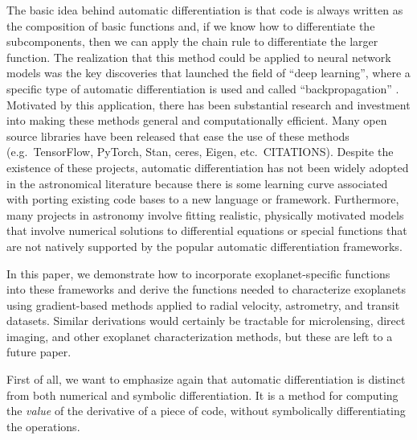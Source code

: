 \documentclass[modern]{aastex62}
\begin{document}
The basic idea behind automatic differentiation is that code is always written
as the composition of basic functions and, if we know how to differentiate the
subcomponents, then we can apply the chain rule to differentiate the larger
function.
The realization that this method could be applied to neural network models was the key discoveries that launched the field of ``deep learning'', where a specific type of automatic differentiation is used and called ``backpropagation'' \citep{LeCun:2015}.
Motivated by this application, there has been substantial research and investment into making these methods general and computationally efficient.
Many open source libraries have been released that ease the use of these methods (e.g.\ TensorFlow, PyTorch, Stan, ceres, Eigen, etc.\ CITATIONS).
Despite the existence of these projects, automatic differentiation has not
been widely adopted in the astronomical literature because there is some
learning curve associated with porting existing code bases to a new language
or framework.
Furthermore, many projects in astronomy involve fitting realistic, physically
motivated models that involve numerical solutions to differential equations
or special functions that are not natively supported by the popular automatic
differentiation frameworks.

In this paper, we demonstrate how to incorporate exoplanet-specific functions
into these frameworks and derive the functions needed to characterize
exoplanets using gradient-based methods applied to radial velocity,
astrometry, and transit datasets.
Similar derivations would certainly be tractable for microlensing, direct
imaging, and other exoplanet characterization methods, but these are left to a
future paper.



First of all, we want to emphasize again that automatic differentiation is distinct from both numerical and symbolic differentiation.
It is a method for computing the \emph{value} of the derivative of a piece of code, without symbolically differentiating the operations.
\end{document}
